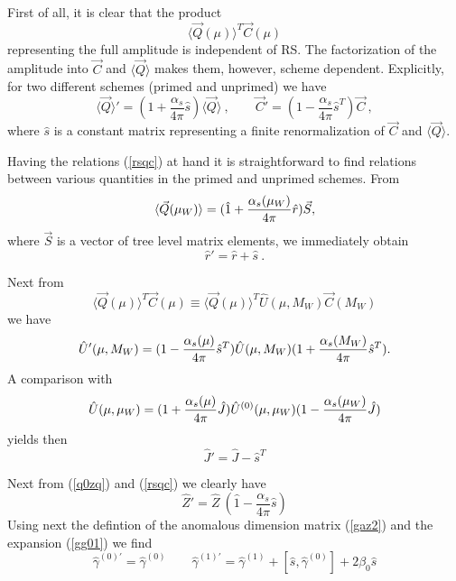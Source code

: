\documentclass[12pt]{article}
\def\as{\alpha_s}
\def\aspi{\frac{\as}{4\pi}}
\begin{document}
\begin{itemize}
\begin{itemize}
\begin{itemize}
First of all, it is clear that the product
\begin{equation}\label{qtc}
\langle\vec Q(\mu)\rangle^T\vec C(\mu)  \end{equation}
representing the full amplitude is independent of RS. 
The factorization of the amplitude into $\vec C$ and
$\langle\vec Q\rangle$
makes them, however, scheme dependent.
Explicitly, for two different schemes
(primed and unprimed) we have
\begin{equation}\label{rsqc}
\langle\vec Q\rangle'
=(1+\aspi \hat s)\langle\vec Q\rangle~,\qquad
 \vec C'=(1-\aspi \hat s^T)\vec C~,  \end{equation}
 where $\hat s$ is a constant matrix representing a finite
renormalization of $\vec C$ and $\langle\vec Q\rangle$.

Having the relations (\ref{rsqc}) at hand it is straightforward
to find relations between various quantities in the primed and
unprimed schemes. From
\begin{equation}\label{qarsP}
\langle\vec Q(\mu_W)\rangle=(\hat 1
+{\as(\mu_W)\over 4\pi} \hat r)\vec S,  \end{equation}
where $\vec S$ is a vector of tree level matrix elements, 
we immediately obtain
\begin{equation}\label{rprs}  
\hat r'=\hat r+ \hat s~.  \end{equation}

Next from
\begin{equation}\label{qtuc} \langle\vec Q(\mu)\rangle^T\vec C(\mu)\equiv
  \langle\vec Q(\mu)\rangle^T \hat U(\mu,M_W) \vec C(M_W)  \end{equation}
we have
\begin{equation}\label{upus} \hat U'(\mu,M_W)=
(1-{\as(\mu)\over 4\pi}\hat s^T)
\hat U(\mu,M_W)(1+{\as(M_W)\over 4\pi}\hat s^T).
\end{equation}
A comparison with 
\begin{equation}\label{u1jjP}
\hat U(\mu,\mu_W)=
(1+{\as(\mu)\over 4\pi} \hat J) \hat U^{(0)}(\mu,\mu_W) 
(1-{\as(\mu_W)\over 4\pi} \hat J)
\end{equation}
 yields then
\begin{equation}\label{jpjs} \hat J'=\hat J-\hat s^T \end{equation}

Next from (\ref{q0zq}) and (\ref{rsqc}) we clearly have
\begin{equation}\label{zpzs}  \hat Z'=\hat Z~ (\hat 1- \aspi \hat s)  
\end{equation}
Using next the defintion of the anomalous dimension matrix
(\ref{gaz2}) and the expansion (\ref{gg01}) we find 
\begin{equation}\label{gpgs}
\hat \gamma^{(0)\prime}=\hat\gamma^{(0)} \qquad
 \hat\gamma^{(1)\prime}=\hat\gamma^{(1)}+[\hat s,\hat\gamma^{(0)}]+
2\beta_0 \hat s \end{equation}


\end{itemize}
\end{itemize}
\end{itemize}
\end{document}
